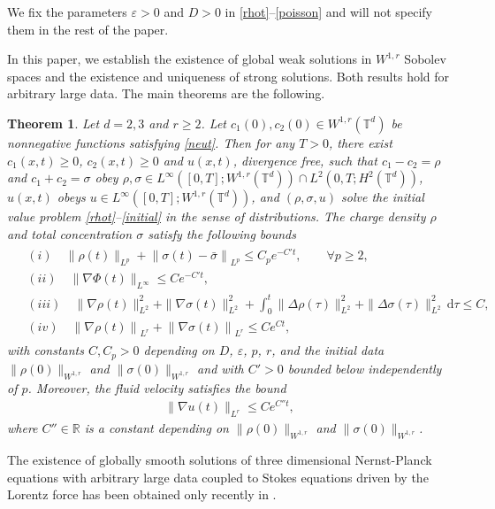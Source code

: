\documentclass[10pt,twoside,reqno]{amsart}
\numberwithin{figure}{section}
\numberwithin{equation}{section}
\newtheorem{theorem}{Theorem}[section]
\theoremstyle{definition}
\newcommand{\1}{\mathbbm{1}}
\newcommand{\diff}{\,\mathrm{d}}
\newcommand{\R}{\mathbb{R}}
\newcommand{\T}{\mathbb{T}}
\newcommand{\ve}{\varepsilon}
\begin{document}
We fix the parameters $\ve > 0$ and $D > 0$ in \eqref{rhot}--\eqref{poisson} and will not specify them in the rest of the paper.


In this paper, we establish the existence of global weak solutions in $W^{1, r}$ Sobolev spaces and the existence and uniqueness of strong solutions. Both results hold for arbitrary large data. The main theorems are the following.

\begin{theorem}
\label{thm:weakglobal}
Let $d = 2, 3$ and $r \geq 2$. Let $c_1(0), c_2(0) \in W^{1, r}(\T^d)$ be nonnegative functions satisfying \eqref{neut}. Then for any $T > 0$, there exist $c_1(x,t)\ge 0$, $c_2(x,t)\ge 0$ and $u(x,t)$, divergence free, such that $c_1 - c_2 = \rho$ and $c_1 + c_2 = \sigma$ obey $\rho, \sigma \in L^{\infty}([0, T]; W^{1, r}(\T^d)) \cap L^2(0, T; H^2(\T^d))$,  $u(x,t)$ obeys $u \in L^{\infty}([0, T]; W^{1, r}(\T^d))$, and $(\rho, \sigma, u)$ solve the initial value problem \eqref{rhot}--\eqref{initial} in the sense of distributions. The charge density $\rho$ and total concentration $\sigma$ satisfy the following bounds
\begin{align}
\label{solest1}
\begin{split}
& (i) \quad \|\rho(t)\|_{L^p} + \left\|\sigma(t) - \bar{\sigma}\right\|_{L^p} \leq C_p e^{- C' t}, \quad \quad \forall p\ge 2,\\
& (ii) \quad \|\nabla \Phi(t)\|_{L^\infty} \leq C e^{- C' t},\\
& (iii) \quad \|\nabla \rho(t)\|_{L^2}^2 + \|\nabla \sigma(t)\|_{L^2}^2 + \int_0^t \|\Delta \rho(\tau)\|_{L^2}^2 + \|\Delta \sigma(\tau)\|_{L^2}^2 \diff{\tau} \leq C,\\
& (iv) \quad \left\|\nabla \rho(t)\right\|_{L^r} + \left\|\nabla \sigma(t)\right\|_{L^r} \leq C e^{C t},
\end{split}
\end{align}
with  constants $C, C_p > 0$ depending on $D$, $\ve$, $p$, $r$, and the initial data $\|\rho(0)\|_{W^{1, r}}$ and $\|\sigma(0)\|_{W^{1, r}}$ and with $C'>0$ bounded below independently of $p$. Moreover, the fluid velocity satisfies the bound
\begin{align}
\label{solest2}
\|\nabla u(t)\|_{L^r} \leq C e^{C'' t},
\end{align}
where $C'' \in \R$ is a constant depending on $\|\rho(0)\|_{W^{1, r}}$ and $\|\sigma(0)\|_{W^{1, r}}$.
\end{theorem}
The existence of globally smooth solutions of three dimensional Nernst-Planck equations with arbitrary large data coupled to Stokes equations driven by the Lorentz force has been obtained only recently in \cite{CIL20pb, Lee21p}.
\end{document}
